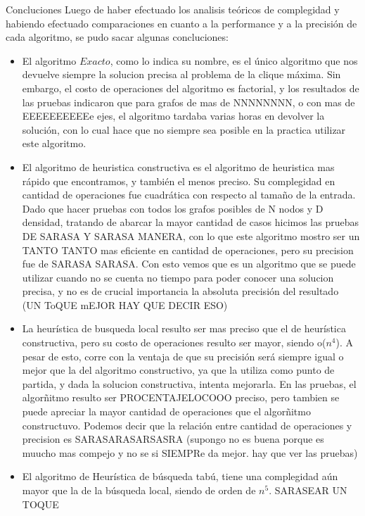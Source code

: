 \documentclass[12pt,titlepage]{article}
\newcommand{\tab}{\hspace*{2em}}
\begin{document}
	\begin{section}{Concluciones}
	\tab Luego de haber efectuado los analisis teóricos de complegidad y habiendo efectuado comparaciones en cuanto a la performance y a la precisión de cada algoritmo, se pudo sacar algunas concluciones:
	\begin{itemize}
		\item El algoritmo $Exacto$, como lo indica su nombre, es el único algoritmo que nos devuelve siempre la solucion precisa al problema de la clique máxima. Sin embargo, el costo de operaciones del algoritmo es factorial, y los resultados de las pruebas indicaron que para grafos de mas de NNNNNNNN, o con mas de EEEEEEEEEEe ejes, el algoritmo tardaba varias horas en devolver la solución, con lo cual hace que no siempre sea posible en la practica utilizar este algoritmo.
		\item El algoritmo de heuristica constructiva es el algoritmo de heuristica mas rápido que encontramos, y también el menos preciso. Su complegidad en cantidad de operaciones fue cuadrática con respecto al tamaño de la entrada. Dado que hacer pruebas con todos los grafos posibles de N nodos y D densidad, tratando de abarcar la mayor cantidad de casos hicimos las pruebas  DE SARASA Y SARASA MANERA, con lo que este algoritmo mostro ser un TANTO TANTO mas eficiente en cantidad de operaciones, pero su precision fue de SARASA SARASA. Con esto vemos que es un algoritmo que se puede utilizar cuando no se cuenta no tiempo para poder conocer una solucion precisa, y no es de crucial importancia la absoluta precisión del resultado (UN ToQUE mEJOR HAY QUE DECIR ESO)
		\item La heurística de busqueda local resulto ser mas preciso que el de heurística constructiva, pero su costo de operaciones resulto ser mayor, siendo o($n^4$). A pesar de esto, corre con la ventaja de que su precisión será siempre igual o mejor que la del algoritmo constructivo, ya que la utiliza como punto de partida, y dada la solucion constructiva, intenta mejorarla. En las pruebas, el algorñitmo resulto ser PROCENTAJELOCOOO preciso, pero tambien se puede apreciar la mayor cantidad de operaciones que el algorñitmo constructuvo. Podemos decir que la relación entre cantidad de operaciones y precision es SARASARASARSASRA (supongo no es buena porque es muucho mas compejo y no se si SIEMPRe da mejor. hay que ver las pruebas)
		\item El algoritmo de Heurística de búsqueda tabú, tiene una complegidad aún mayor que la de la búsqueda local, siendo de orden de $n^5$. SARASEAR UN TOQUE
	\end{itemize}	
	\end{section}
	
\end{document}
